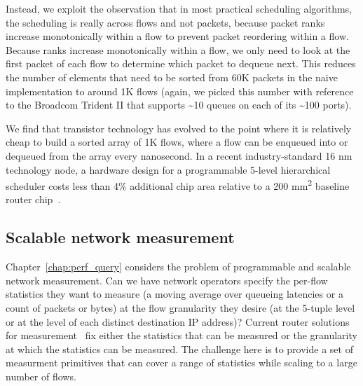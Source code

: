 Instead, we exploit the observation that in most practical scheduling
algorithms, the scheduling is really across flows and not packets, because
packet ranks increase monotonically within a flow to prevent packet reordering
within a flow. Because ranks increase monotonically within a flow, we only need
to look at the first packet of each flow to determine which packet to dequeue
next. This reduces the number of elements that need to be sorted from 60K
packets in the naive implementation to around 1K flows (again, we picked this
number with reference to the Broadcom Trident II that supports \textasciitilde10 queues
on each of its \textasciitilde100 ports).

We find that transistor technology has evolved to the point where it is
relatively cheap to build a sorted array of 1K flows, where a flow can be
enqueued into or dequeued from the array every nanosecond. In a recent
industry-standard 16 nm technology node, a hardware design for a programmable
5-level hierarchical scheduler costs less than 4\% additional chip area
relative to a 200 \si{\milli\meter\squared} baseline router
chip~\cite{glen_parsing}.

\subsection{Scalable network measurement}

Chapter~\ref{chap:perf_query} considers the problem of programmable and
scalable network measurement. Can we have network operators specify the
per-flow statistics they want to measure (\eg a moving average over queueing
latencies or a count of packets or bytes) at the flow granularity they desire
(\eg at the 5-tuple level or at the level of each distinct destination IP
address)? Current router solutions for measurement~\cite{netflow, tetration-telemetry}
fix either the statistics that can be measured or the granularity at which the
statistics can be measured. The challenge here is to provide a set of
measurment primitives that can cover a range of statistics while scaling to a
large number of flows.


